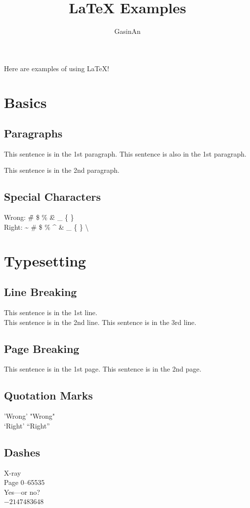 \documentclass[a4paper,10pt]{article}
\title{\LaTeX{} Examples}
\author{GasinAn}
\begin{document}
    \maketitle
    Here are examples of using \LaTeX{}!
    \section{Basics}
    \subsection{Paragraphs}
    This sentence is in the 1st paragraph.
    This sentence is also in the 1st paragraph.

    This sentence is in the 2nd paragraph.
    \subsection{Special Characters}
    Wrong: \~ \# \$ \% \^ \& \_ \{ \} \\
    Right: \~{} \#{} \${} \%{} \^{} \&{} \_{} \{{} \}{} \textbackslash{}
    \section{Typesetting}
    \subsection{Line Breaking}
    This sentence is in the 1st line.\\
    This sentence is in the 2nd line.\newline
    This sentence is in the 3rd line.
    \subsection{Page Breaking}
    This sentence is in the 1st page.\newpage
    This sentence is in the 2nd page.
    \subsection{Quotation Marks}
    'Wrong' "Wrong"\\
    `Right' ``Right''
    \subsection{Dashes}
    X-ray\\
    Page 0--65535\\
    Yes---or no?\\
    $-2147483648$
\end{document}
